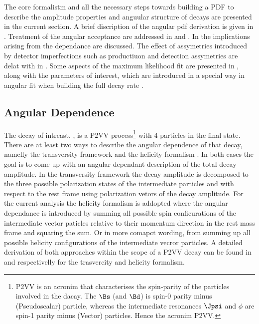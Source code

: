 
The core formalistm and all the necessary steps towards building a PDF to describe the amplitude properties and anguular structure of \BJpsiKst decays are presented in
the current section. A brief discription of the angular pdf derivation is given in .
Treatment of the angular acceptance are addressed in  and .
In  the implications arising from the \mkpi dependance are discussed.
The effect of assymetries introduced by detector imperfections such as productiuon and detection assymetries are delat with
in . Some aspects of the maximum likelihood fit are presented in ,
along with the \ACP parameters of interest, which are introduced in a special way in angular fit when building the full decay rate \pdf.


\subsection{Angular Dependence}
\label{Diferential_Decay_Rate}
The decay of intreast, \BJpsiKst, is a P2VV process\footnote{P2VV is an acronim that characterises the spin-parity of the particles involved in the dacay.
The $\Bs$ (and $\Bd$) is spin-0 parity minus (Pseudoscalar) particle, whereas the intermediate resonances $\Jpsi$ and $\phi$ are spin-1 parity minus (Vector) particles. Hence the
acronim P2VV.} with 4 particles in the final state. There are at least two ways to describe the angular dependence of that decay, namelly the transversity framework \cite{transvFrameworkI,transvFrameworkII}
and the helicity formalism \cite{helicityFormI,helicityFormII}. In both cases the goal is to come up with an angular dependant description of the total decay amplitude.
In the transversity framework the decay amplitude is decomposed to the three possible polarization states of the intermediate particles \Jpsi and \Kst with respect to 
the \Bs rest frame using polarization vetors of the decay amplitude. For the current analysis the helicity formalism is addopted where the angular dependance is 
introduced by summing all possible spin conficurations of the intermediate vector paticles relative to their momentum direction in the \Bs rest mass frame
and squaring the sum. Or in more comapct wording, from summing up all possible helicity configurations of the intermediate vecror particles. A detailed derivation of both 
approaches within the scope of a P2VV decay can be found in \cite{daanThesis} and \cite{jeroenThesis} respectivelly for the trasvercity and helicity formalism.

